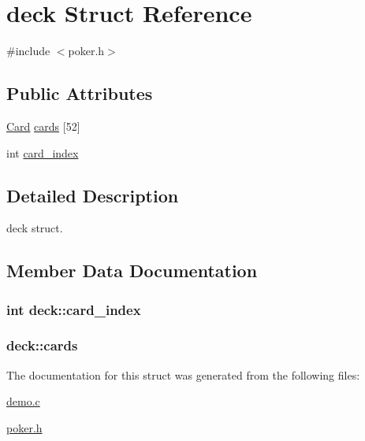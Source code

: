 \hypertarget{structdeck}{\section{deck Struct Reference}
\label{structdeck}
}


{\ttfamily \#include $<$poker.\+h$>$}

\subsection*{Public Attributes}
\begin{DoxyCompactItemize}
\item 
\hyperlink{demo_8c_aacb186b77382a02f7317dc38797f37c2}{Card} \hyperlink{structdeck_a1843a9bb2bf3ca7730d87f0fd3f5531c}{cards} \mbox{[}52\mbox{]}
\item 
int \hyperlink{structdeck_ae54744d27adeb53f8120417e6b295510}{card\+\_\+index}
\end{DoxyCompactItemize}


\subsection{Detailed Description}
deck struct. 

\subsection{Member Data Documentation}
\hypertarget{structdeck_ae54744d27adeb53f8120417e6b295510}{
\subsubsection[{card\+\_\+index}]{\setlength{\rightskip}{0pt plus 5cm}int deck\+::card\+\_\+index}}\label{structdeck_ae54744d27adeb53f8120417e6b295510}
\hypertarget{structdeck_a1843a9bb2bf3ca7730d87f0fd3f5531c}{
\subsubsection[{cards}]{ deck\+::cards}}\label{structdeck_a1843a9bb2bf3ca7730d87f0fd3f5531c}


The documentation for this struct was generated from the following files\+:\begin{DoxyCompactItemize}
\item 
\hyperlink{demo_8c}{demo.\+c}\item 
\hyperlink{poker_8h}{poker.\+h}\end{DoxyCompactItemize}
